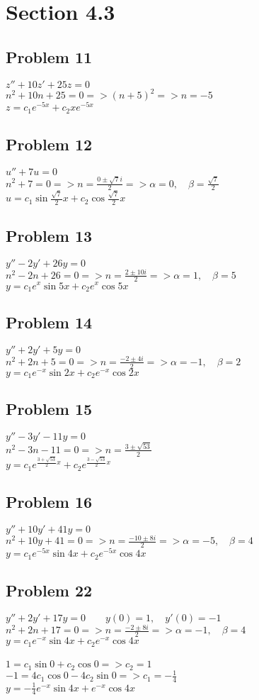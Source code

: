 \documentclass[12pt]{exam}
\begin{document}
\section*{Section 4.3}
\subsection*{Problem 11}
$z''+10z'+25z=0$\\
$n^2+10n+25=0=>(n+5)^2=>n=-5$\\
$z=c_1e^{-5x}+c_2xe^{-5x}$
\subsection*{Problem 12}
$u''+7u=0$\\
$n^2+7=0=>n=\frac{0\pm\sqrt{7}i}{2}=>\alpha=0,\quad\beta=\frac{\sqrt{7}}{2}$\\
$u=c_1\sin{\frac{\sqrt{7}}{2}x}+c_2\cos{\frac{\sqrt{7}}{2}x}$
\subsection*{Problem 13}
$y''-2y'+26y=0$\\
$n^2-2n+26=0=>n=\frac{2\pm10i}{2}=>\alpha=1,\quad\beta=5$\\
$y=c_1e^{x}\sin{5x}+c_2e^{x}\cos{5x}$
\subsection*{Problem 14}
$y''+2y'+5y=0$\\
$n^2+2n+5=0=>n=\frac{-2\pm4i}{2}=>\alpha=-1,\quad\beta=2$\\
$y=c_1e^{-x}\sin{2x}+c_2e^{-x}\cos{2x}$
\subsection*{Problem 15}
$y''-3y'-11y=0$\\
$n^2-3n-11=0=>n=\frac{3\pm\sqrt{53}}{2}$\\
$y=c_1e^{\frac{3+\sqrt{53}}{2}x}+c_2e^{\frac{3-\sqrt{53}}{2}x}$
\subsection*{Problem 16}
$y''+10y'+41y=0$\\
$n^2+10y+41=0=>n=\frac{-10\pm8i}{2}=>\alpha=-5,\quad\beta=4$\\
$y=c_1e^{-5x}\sin{4x}+c_2e^{-5x}\cos{4x}$
\subsection*{Problem 22}
$y''+2y'+17y=0\qquad y(0)=1,\quad y'(0)=-1$\\
$n^2+2n+17=0=>n=\frac{-2\pm8i}{2}=>\alpha=-1,\quad\beta=4$\\
$y=c_1e^{-x}\sin{4x}+c_2e^{-x}\cos{4x}$\\\\
$1=c_1\sin{0}+c_2\cos{0}=>c_2=1$\\
$-1=4c_1\cos{0}-4c_2\sin{0}=>c_1=-\frac{1}{4}$\\
$y=-\frac{1}{4}e^{-x}\sin{4x}+e^{-x}\cos{4x}$
\end{document}
